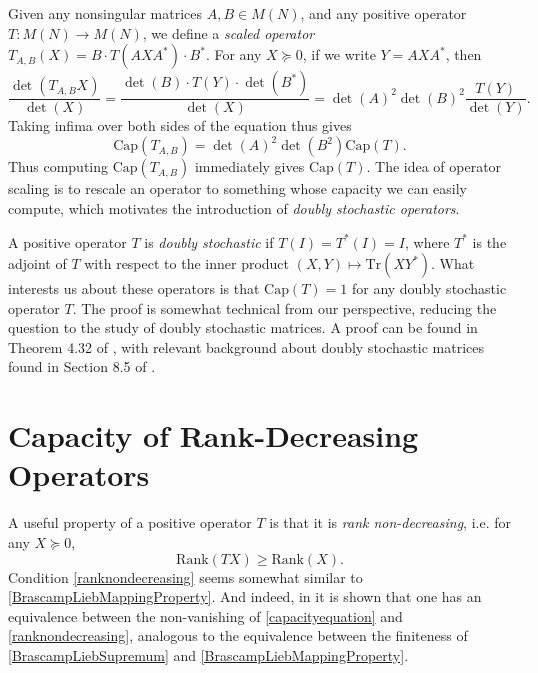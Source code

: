 \documentclass[12pt]{article}
\begin{document}
Given any nonsingular matrices $A,B \in M(N)$, and any positive operator $T: M(N) \to M(N)$, we define a \emph{scaled operator} $T_{A,B}(X) = B \cdot T(A X A^*) \cdot B^*$. For any $X \succeq 0$, if we write $Y = AXA^*$, then
%
\[ \frac{\det(T_{A,B}X)}{\det(X)} = \frac{\det(B) \cdot T(Y) \cdot \det(B^*)}{\det(X)} = \det(A)^2 \det(B)^2 \frac{T(Y)}{\det(Y)}. \]
%
Taking infima over both sides of the equation thus gives
%
\[ \text{Cap}(T_{A,B}) = \det(A)^2 \det(B^2) \text{Cap}(T). \]
%
Thus computing $\text{Cap}(T_{A,B})$ immediately gives $\text{Cap}(T)$. The idea of operator scaling is to rescale an operator to something whose capacity we can easily compute, which motivates the introduction of \emph{doubly stochastic operators}.

A positive operator $T$ is \emph{doubly stochastic} if $T(I) = T^*(I) = I$, where $T^*$ is the adjoint of $T$ with respect to the inner product $(X,Y) \mapsto \text{Tr}(XY^*)$. What interests us about these operators is that $\text{Cap}(T) = 1$ for any doubly stochastic operator $T$. The proof is somewhat technical from our perspective, reducing the question to the study of doubly stochastic matrices. A proof can be found in Theorem 4.32 of \cite{watrous}, with relevant background about doubly stochastic matrices found in Section 8.5 of \cite{serre}.


\section{Capacity of Rank-Decreasing Operators}

A useful property of a positive operator $T$ is that it is \emph{rank non-decreasing}, i.e. for any $X \succeq 0$,
%
\begin{equation} \label{ranknondecreasing}
    \text{Rank}(TX) \geq \text{Rank}(X).
\end{equation}
%
Condition \eqref{ranknondecreasing} seems somewhat similar to \eqref{BrascampLiebMappingProperty}. And indeed, in \cite{gurv2004} it is shown that one has an equivalence between the non-vanishing of \eqref{capacityequation} and \eqref{ranknondecreasing}, analogous to the equivalence between the finiteness of \eqref{BrascampLiebSupremum} and \eqref{BrascampLiebMappingProperty}.
\end{document}
